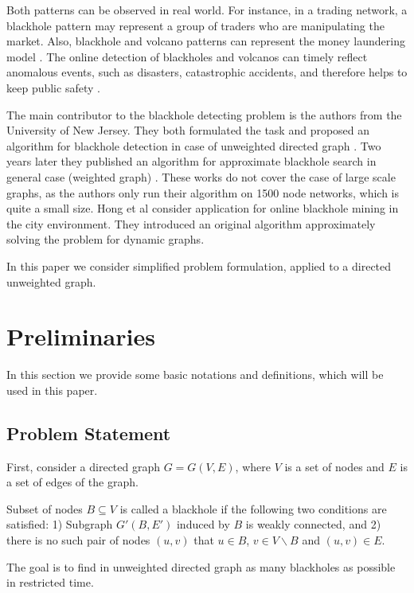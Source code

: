 \documentclass{svproc}
\begin{document}
Both patterns can be observed in real world.
For instance, in a trading network, a blackhole pattern may represent a group of traders who are
manipulating the market. Also, blackhole and volcano patterns can represent the money laundering model \cite{semenov2017survey}.
The online detection of blackholes and volcanos can timely 
reflect anomalous events, such as disasters, catastrophic accidents, and therefore helps to keep public safety \cite{hong2015detecting}.

The main contributor to the blackhole detecting problem is the authors from the University of New Jersey. They both formulated the task and proposed an algorithm for blackhole detection in case of unweighted directed graph \cite{li2010detecting}. 
Two years later they published an algorithm for approximate blackhole search in general case (weighted graph) \cite{li2012mining,li2014mining}. These works do not cover the case of large scale graphs, as the authors only run their algorithm on 1500 node networks, which is quite a small size.
Hong et al \cite{hong2015detecting} consider application for online blackhole mining in the city environment. They introduced an original algorithm approximately solving the problem for dynamic graphs.  

In this paper we consider simplified problem formulation, applied to a directed unweighted graph.

\section{Preliminaries}
In this section we provide some basic notations and definitions, which will be used in this paper. 

\subsection{Problem Statement} 
First, consider a directed graph $G = G(V,E)$, where $V$ is a set of nodes and $E$ is a set of edges of the graph. 

\begin{definition}
Subset of nodes $B \subseteq V$ is called a blackhole if  the following two conditions are satisfied: 
1) Subgraph $G'(B, E')$ induced by $B$ is weakly connected, 
and
2) there is no such pair of nodes $(u,v)$ that $u \in B$, $v \in V \backslash B$ and $(u,v) \in E$.
\end{definition}

The goal is to find in unweighted directed graph as many blackholes as possible in restricted time.
\end{document}
